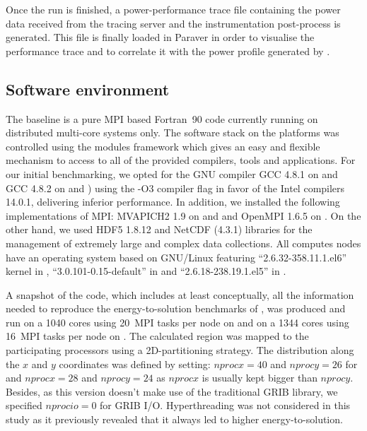 Once  the run  is finished,  a power-performance trace file containing the power 
data received from the tracing server and the instrumentation post-process is generated.
This file is finally loaded in Paraver in order to visualise the performance trace and to correlate it with the power profile generated by \cosmoart.

\subsection{Software environment}
\label{subsec:3.2}

The \cosmoart  baseline is a  pure MPI based  Fortran~90 code
currently  running  on   distributed  multi-core  systems  only.   The
software stack on the platforms was controlled using the modules
framework which gives an easy  and flexible mechanism to access to all
of the  provided compilers, tools  and applications.  For  our initial
benchmarking,   we  opted   for   the  GNU   compiler  GCC 4.8.1   on
\monch and GCC 4.8.2 on  \pilat and \tinto) using the -O3 compiler
flag  in favor  of the  Intel compilers 14.0.1,  delivering inferior
performance.  In  addition, we installed the following implementations of MPI: MVAPICH2 1.9 on \monch and \pilat and  OpenMPI 1.6.5 on \tinto. On the other hand, we  used HDF5 1.8.12 and NetCDF  (4.3.1) libraries for  the management  of extremely  large and
complex data collections.  All computes nodes have an operating system
based on GNU/Linux featuring ``2.6.32-358.11.1.el6'' kernel in
\monch, ``3.0.101-0.15-default'' in \pilat and ``2.6.18-238.19.1.el5'' in \tinto.

A snapshot of the code,  which includes at least conceptually, all the
information needed  to reproduce the  energy-to-solution benchmarks of
\cosmoart, was produced and run  on a 1040 cores using 20~MPI
tasks  per node on  \monch and  on a  1344 cores  using 16~MPI
tasks per node on  \pilat.  The calculated region was mapped
to the participating processors using a 2D-partitioning strategy.  The
distribution along the $x$ and $y$ coordinates was defined by setting:
$nprocx=40$  and $nprocy=26$  for \monch  and  $nprocx=28$ and
$nprocy=24$  as  $nprocx$  is   usually  kept  bigger  than  $nprocy$.
Besides,  as this  version doesn't  make use  of the  traditional GRIB
library, we  specified $nprocio=0$  for GRIB I/O.   Hyperthreading was
not considered in this study  as it previously revealed that it always
led to higher energy-to-solution.



